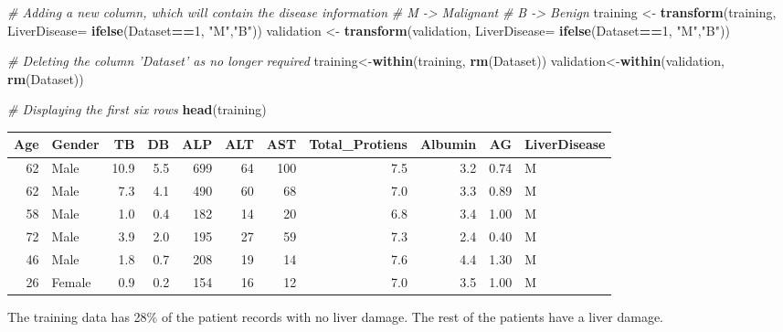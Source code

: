 \documentclass[]{article}
\newenvironment{Shaded}{\begin{snugshade}}{\end{snugshade}}
\newcommand{\CommentTok}[1]{\textcolor[rgb]{0.56,0.35,0.01}{\textit{#1}}}
\newcommand{\DataTypeTok}[1]{\textcolor[rgb]{0.13,0.29,0.53}{#1}}
\newcommand{\DecValTok}[1]{\textcolor[rgb]{0.00,0.00,0.81}{#1}}
\newcommand{\FloatTok}[1]{\textcolor[rgb]{0.00,0.00,0.81}{#1}}
\newcommand{\KeywordTok}[1]{\textcolor[rgb]{0.13,0.29,0.53}{\textbf{#1}}}
\newcommand{\NormalTok}[1]{#1}
\newcommand{\OperatorTok}[1]{\textcolor[rgb]{0.81,0.36,0.00}{\textbf{#1}}}
\newcommand{\StringTok}[1]{\textcolor[rgb]{0.31,0.60,0.02}{#1}}
\begin{document}
\begin{Shaded}
\begin{Highlighting}[]
\CommentTok{# Adding a new column, which will contain the disease information}
\CommentTok{# M -> Malignant}
\CommentTok{# B -> Benign}
\NormalTok{training <-}\StringTok{ }\KeywordTok{transform}\NormalTok{(training, }\DataTypeTok{LiverDisease=} \KeywordTok{ifelse}\NormalTok{(Dataset}\OperatorTok{==}\DecValTok{1}\NormalTok{, }\StringTok{"M"}\NormalTok{,}\StringTok{"B"}\NormalTok{))}
\NormalTok{validation <-}\StringTok{ }\KeywordTok{transform}\NormalTok{(validation, }\DataTypeTok{LiverDisease=} \KeywordTok{ifelse}\NormalTok{(Dataset}\OperatorTok{==}\DecValTok{1}\NormalTok{, }\StringTok{"M"}\NormalTok{,}\StringTok{"B"}\NormalTok{))}

\CommentTok{# Deleting the column 'Dataset' as no longer required}
\NormalTok{training<-}\KeywordTok{within}\NormalTok{(training, }\KeywordTok{rm}\NormalTok{(Dataset))}
\NormalTok{validation<-}\KeywordTok{within}\NormalTok{(validation, }\KeywordTok{rm}\NormalTok{(Dataset))}

\CommentTok{# Displaying the first six rows}
\KeywordTok{head}\NormalTok{(training)}
\end{Highlighting}
\end{Shaded}

\begin{longtable}[]{@{}rlrrrrrrrrl@{}}
\toprule
Age & Gender & TB & DB &
ALP & ALT & AST & Total\_Protiens & Albumin &
AG & LiverDisease\tabularnewline
\midrule
\endhead
62 & Male & 10.9 & 5.5 & 699 & 64 & 100 & 7.5 & 3.2 & 0.74 &
M\tabularnewline
62 & Male & 7.3 & 4.1 & 490 & 60 & 68 & 7.0 & 3.3 & 0.89 &
M\tabularnewline
58 & Male & 1.0 & 0.4 & 182 & 14 & 20 & 6.8 & 3.4 & 1.00 &
M\tabularnewline
72 & Male & 3.9 & 2.0 & 195 & 27 & 59 & 7.3 & 2.4 & 0.40 &
M\tabularnewline
46 & Male & 1.8 & 0.7 & 208 & 19 & 14 & 7.6 & 4.4 & 1.30 &
M\tabularnewline
26 & Female & 0.9 & 0.2 & 154 & 16 & 12 & 7.0 & 3.5 & 1.00 &
M\tabularnewline
\bottomrule
\end{longtable}

The training data has 28\% of the patient records with no liver
damage. The rest of the patients have a liver damage.

\begin{Shaded}
\end{Shaded}
\end{document}
